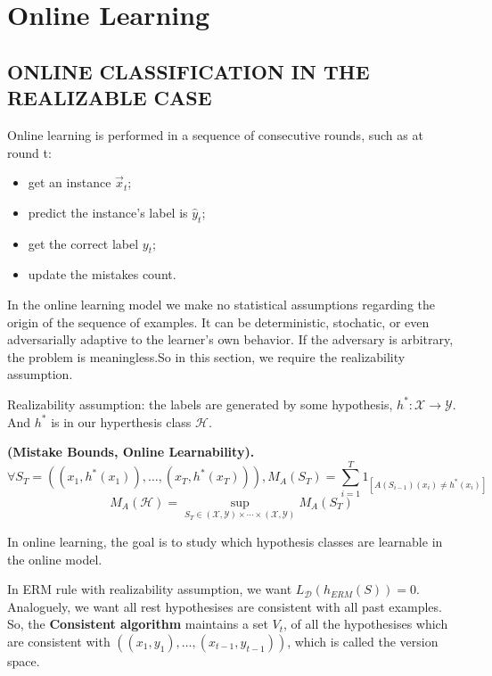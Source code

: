 
\section{Online Learning}%
\label{sec:online_learning}

\subsection{ONLINE CLASSIFICATION IN THE REALIZABLE CASE}%
\label{sub:online_classification_in_the_realizable_case}

Online learning is performed in a sequence of consecutive rounds, such as at round t:
\begin{itemize}
    \item get an instance $ \vec{x}_t $;
    \item predict the instance's label is $ \hat{y}_t $;
    \item get the correct label $ y_t $;
    \item update the mistakes count.
\end{itemize}

In the online learning model we make no statistical assumptions regarding the origin of the sequence of examples.
It can be deterministic, stochatic, or even adversarially adaptive to the learner's own behavior. If the adversary is arbitrary, the problem is meaningless.So in this section, we require the realizability assumption.

Realizability assumption: the labels are generated by some hypothesis, $ h^*: \mathcal{X} \rightarrow \mathcal{Y} $. And $ h^* $ is in our hyperthesis class $ \mathcal{H} $.

\begin{definition}
    \textbf{(Mistake Bounds, Online Learnability).}\\
    \[
        \forall S_T = ((x_1, h^*(x_1)), \ldots, (x_T, h^*(x_T))),
        M_A(S_T) =  \sum^{T}_{i=1} 1_{[A(S_{i-1})(x_i) \ne h^*(x_i)]} 
    \]
    \[
        M_{A}(\mathcal{H}) = \sup_{S_T \in (\mathcal{X}, \mathcal{Y})\times \cdots \times (\mathcal{X}, \mathcal{Y})} M_A(S_{T})
    \]
\end{definition}

In online learning, the goal is to study which hypothesis classes are learnable in the online model.

In ERM rule with realizability assumption, we want $ L_{\mathcal{D}}(h_{ERM}(S)) = 0 $. Analoguely, we want all rest hypothesises are consistent with all past examples. So, the \textbf{Consistent algorithm} maintains a set $ V_t $, of all the hypothesises which are consistent with $ ((x_1, y_1), \ldots, (x_{t-1}, y_{t-1})) $, which is called the version space.

